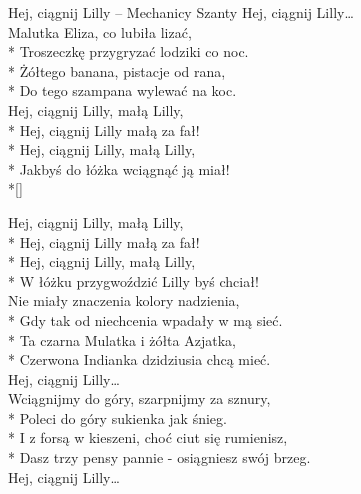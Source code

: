 \begin{piosenka_dluga}{Hej, ciągnij Lilly -- Mechanicy Szanty}
 Hej, ciągnij Lilly\ldots \\[\zwrotkaspace]

Malutka Eliza, co lubiła lizać, \\*
Troszeczkę przygryzać lodziki co noc. \\*
Żółtego banana, pistacje od rana, \\*
Do tego szampana wylewać na koc. \\[\zwrotkaspace]

 Hej, ciągnij Lilly, małą Lilly, \\*
 Hej, ciągnij Lilly małą za fał! \\*
 Hej, ciągnij Lilly, małą Lilly, \\*
 Jakbyś do łóżka wciągnąć ją miał! \\*[\zwrotkaspace]

 Hej, ciągnij Lilly, małą Lilly, \\*
 Hej, ciągnij Lilly małą za fał! \\*
 Hej, ciągnij Lilly, małą Lilly, \\*
 W łóżku przygwoździć Lilly byś chciał! \\[\zwrotkaspace]

Nie miały znaczenia kolory nadzienia, \\*
Gdy tak od niechcenia wpadały w mą sieć. \\*
Ta czarna Mulatka i żółta Azjatka, \\*
Czerwona Indianka dzidziusia chcą mieć. \\[\zwrotkaspace]

 Hej, ciągnij Lilly\ldots \\[\zwrotkaspace]

Wciągnijmy do góry, szarpnijmy za sznury, \\*
Poleci do góry sukienka jak śnieg. \\*
I z forsą w kieszeni, choć ciut się rumienisz, \\*
Dasz trzy pensy pannie - osiągniesz swój brzeg. \\[\zwrotkaspace]

 Hej, ciągnij Lilly\ldots \\[\zwrotkaspace]

\end{piosenka_dluga}